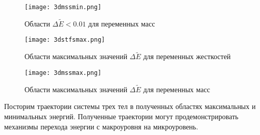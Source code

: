\begin{figure}[b!]
    \centering
    \texttt{[image: 3dmssmin.png]}
    \caption{Области $\Delta \tilde{E} < 0.01$  для переменных масс}
    \label{minmss3d}
\end{figure}

\begin{figure}[b!]
    \centering
    \texttt{[image: 3dstfsmax.png]}
    \caption{Области максимальных значений $\Delta \tilde{E}$  для переменных жесткостей}
    \label{minmss3d}
\end{figure}

\newpage
\begin{figure}[b!]
    \centering
    \texttt{[image: 3dmssmax.png]}
    \caption{Области максимальных значений $\Delta \tilde{E}$  для переменных масс}
    \label{minmss3d}
\end{figure}

Посторим траектории системы трех тел в полученных областях максимальных и минимальных энергий. Полученные траектории могут продемонстрировать механизмы перехода
энергии с макроуровня на микроуровень.

